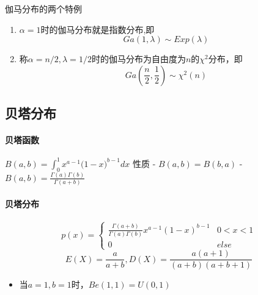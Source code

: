 伽马分布的两个特例
\begin{enumerate}
    \item $\alpha=1$时的伽马分布就是指数分布,即
          $$
              Ga(1,\lambda) \sim Exp(\lambda)
          $$
    \item 称$\alpha=n/2,\lambda=1/2$时的伽马分布为自由度为$n$的$\chi^2$分布，即
          $$
              Ga(\frac{n}{2},\frac{1}{2}) \sim \chi^2(n)
          $$
\end{enumerate}


\subsection{贝塔分布}
\paragraph{贝塔函数} $B(a,b) = \int_0^1 {{x^{a - 1}}(1 - } x{)^{b - 1}}dx$
性质
- $B(a,b) = B(b,a)$
- $B(a,b) = \frac{{\Gamma (a)\Gamma (b)}}{{\Gamma (a + b)}}$

\paragraph{贝塔分布}
$$p(x) = \left\{ {\begin{array}{*{20}{c}}
                {\frac{{\Gamma (a + b)}}{{\Gamma (a)\Gamma (b)}}{x^{a - 1}}{{(1 - x)}^{b - 1}}} & {0 < x < 1} \\
                0                                                                               & {else}
            \end{array}} \right.$$
$$E(X) = \frac{a}{{a + b}},D(X) = \frac{{a(a + 1)}}{{(a + b)(a + b + 1)}}$$


\begin{itemize}
    \item 当$a=1,b=1$时，$Be(1,1)=U(0,1)$
\end{itemize}

